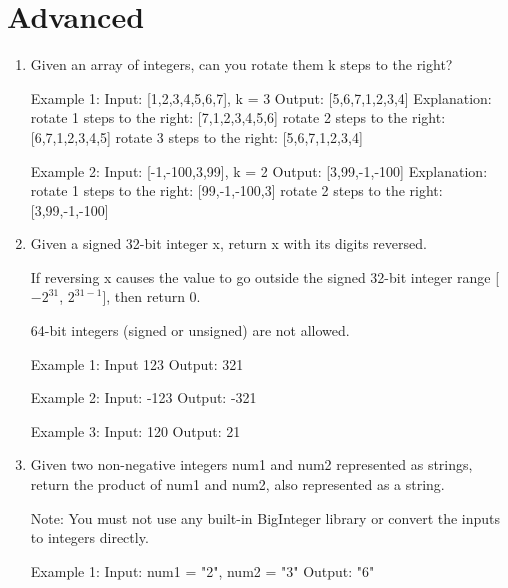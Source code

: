 \section{Advanced}

\newpage
\begin{enumerate}
\item
Given an array of integers, can you rotate them k steps to the right?


\begin{consolethree}
Example 1:
Input: [1,2,3,4,5,6,7], k = 3
Output: [5,6,7,1,2,3,4]
Explanation:
rotate 1 steps to the right: [7,1,2,3,4,5,6] 
rotate 2 steps to the right: [6,7,1,2,3,4,5] 
rotate 3 steps to the right: [5,6,7,1,2,3,4]

Example 2:
Input: [-1,-100,3,99], k = 2
Output: [3,99,-1,-100]
Explanation:
rotate 1 steps to the right: [99,-1,-100,3]
rotate 2 steps to the right: [3,99,-1,-100]
\end{consolethree}
\newpage


\item
Given a signed 32-bit integer x, return x with its digits reversed.

If reversing x causes the value to go outside the signed 32-bit integer range [$-2^{31}$,  $2^{31 - 1}$], then return 0.

64-bit integers (signed or unsigned) are not allowed.

\begin{consolethree}
Example 1:
Input 123 
Output: 321 

Example 2:
Input: -123 
Output: -321 

Example 3:
Input: 120 
Output: 21
\end{consolethree}
\newpage


\item
Given two non-negative integers num1 and num2 represented as strings, return the product of num1 and num2, also represented as a string.

Note: You must not use any built-in BigInteger library or convert the inputs to integers directly. 

\begin{consolethree}
Example 1:
Input: num1 = "2", num2 = "3" 
Output: "6" 


\end{consolethree}
\end{enumerate}
